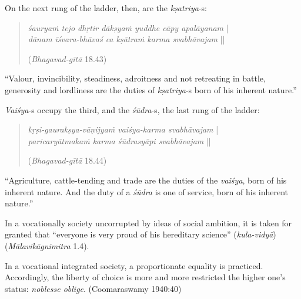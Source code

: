 On the next rung of the ladder, then, are the {\sl kṣatriya}-s:
\begin{quote}
{{\sl śauryaṁ tejo dhṛtir dākṣyaṁ yuddhe cāpy apalāyanam}} |\\
{\sl dānam īśvara-bhāvaś ca kṣātraṁ karma svabhāvajam} || 

\hfill ({\sl Bhagavad-gītā} 18.43)
\end{quote}

\begin{myquote}
“Valour, invincibility, steadiness, adroitness and not retreating in battle, generosity and lordliness are the duties of {\sl kṣatriya}-s born of his inherent nature.”
\end{myquote}

{\sl Vaiśya}-s occupy the third, and the {\sl śūdra}-s, the last rung of the ladder: 

\begin{quote}
{{\sl kṛṣi-gaurakṣya-vāṇijyaṁ vaiśya-karma svabhāvajam}} |\\
{\sl paricaryātmakaṁ karma śūdrasyāpi svabhāvajam} || 

\hfill ({\sl Bhagavad-gītā} 18.44)
\end{quote}

\begin{myquote}
“Agriculture, cattle-tending and trade are the duties of the {\sl vaiśya}, born of his inherent nature. And the duty of a {\sl śūdra} is one of service, born of his inherent nature.”
\end{myquote}

In a vocationally society uncorrupted by ideas of social ambition, it is taken for granted that “everyone is very proud of his hereditary science” ({\sl kula-vidyā}) ({\sl Mālavikāgnimitra} 1.4).

In a vocational integrated society, a proportionate equality is practiced. Accordingly, the liberty of choice is more and more restricted the higher one’s status: {\sl noblesse oblige}. (Coomaraswamy 1940:40)

